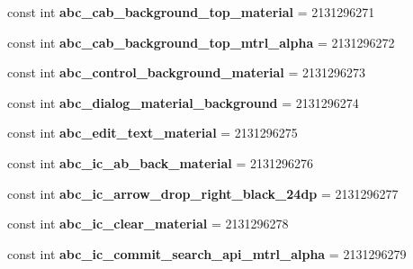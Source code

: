 \begin{DoxyCompactItemize}
const int {\bfseries abc\+\_\+cab\+\_\+background\+\_\+top\+\_\+material} = 2131296271
\item 
\mbox{\label{classst_delivery_1_1_resource_1_1_drawable_abff7509a362b14a7be88f9f29abea604}} 
const int {\bfseries abc\+\_\+cab\+\_\+background\+\_\+top\+\_\+mtrl\+\_\+alpha} = 2131296272
\item 
\mbox{\label{classst_delivery_1_1_resource_1_1_drawable_a1a74e30e8fd38335b6ed44f4f676c1a6}} 
const int {\bfseries abc\+\_\+control\+\_\+background\+\_\+material} = 2131296273
\item 
\mbox{\label{classst_delivery_1_1_resource_1_1_drawable_af058d4762e04cbf78302074b0e29e76e}} 
const int {\bfseries abc\+\_\+dialog\+\_\+material\+\_\+background} = 2131296274
\item 
\mbox{\label{classst_delivery_1_1_resource_1_1_drawable_a58a64784233c9ecb9617c054a72a37a9}} 
const int {\bfseries abc\+\_\+edit\+\_\+text\+\_\+material} = 2131296275
\item 
\mbox{\label{classst_delivery_1_1_resource_1_1_drawable_a6e60cc4242ed4746e8c9a7052230da64}} 
const int {\bfseries abc\+\_\+ic\+\_\+ab\+\_\+back\+\_\+material} = 2131296276
\item 
\mbox{\label{classst_delivery_1_1_resource_1_1_drawable_ab8513d29db50117444a764a6ce8e2096}} 
const int {\bfseries abc\+\_\+ic\+\_\+arrow\+\_\+drop\+\_\+right\+\_\+black\+\_\+24dp} = 2131296277
\item 
\mbox{\label{classst_delivery_1_1_resource_1_1_drawable_aa32c913696b8ffc70b1e4fc85072308b}} 
const int {\bfseries abc\+\_\+ic\+\_\+clear\+\_\+material} = 2131296278
\item 
\mbox{\label{classst_delivery_1_1_resource_1_1_drawable_a80edc2a437d6b7bbed6d0d1f2605a020}} 
const int {\bfseries abc\+\_\+ic\+\_\+commit\+\_\+search\+\_\+api\+\_\+mtrl\+\_\+alpha} = 2131296279

\end{DoxyCompactItemize}
